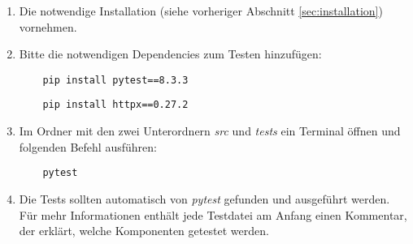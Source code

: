 \begin{enumerate}
  \item Die notwendige Installation (siehe vorheriger Abschnitt \ref{sec:installation}) vornehmen.
  \item Bitte die notwendigen Dependencies zum Testen hinzufügen:
  
  \begin{verbatim}
    pip install pytest==8.3.3
  \end{verbatim}

  \begin{verbatim}
    pip install httpx==0.27.2
  \end{verbatim}

  \item Im Ordner mit den zwei Unterordnern \textit{src} und \textit{tests} ein Terminal öffnen und folgenden Befehl ausführen:
  
  \begin{verbatim}
    pytest
  \end{verbatim}

  \item Die Tests sollten automatisch von \textit{pytest} gefunden und ausgeführt werden. Für mehr Informationen enthält jede Testdatei am Anfang einen Kommentar, der erklärt, welche Komponenten
  getestet werden.
\end{enumerate}
